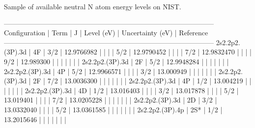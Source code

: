 \begin{table}
		\caption{Sample of available neutral N atom energy levels on NIST.\cite{NIST_ASD}}
		\begin{verbbox}
--------------------------------------------------------------------------------------------
Configuration      | Term   |    J |            Level (eV) |   Uncertainty (eV) | Reference
--------------------------------------------------------------------------------------------
2s2.2p2.(3P).3d    | 4F     |  3/2 |          12.9766982   |                    |          
                   |        |  5/2 |          12.9790452   |                    |          
                   |        |  7/2 |          12.9832470   |                    |          
                   |        |  9/2 |          12.989300    |                    |          
                   |        |      |                       |                    |           
2s2.2p2.(3P).3d    | 2F     |  5/2 |          12.9948284   |                    |          
                   |        |      |                       |                    |           
2s2.2p2.(3P).3d    | 4P     |  5/2 |          12.9966571   |                    |          
                   |        |  3/2 |          13.000949    |                    |          
                   |        |      |                       |                    |           
2s2.2p2.(3P).3d    | 2F     |  7/2 |          13.0036300   |                    |          
                   |        |      |                       |                    |           
2s2.2p2.(3P).3d    | 4P     |  1/2 |          13.004219    |                    |          
                   |        |      |                       |                    |           
2s2.2p2.(3P).3d    | 4D     |  1/2 |          13.016403    |                    |          
                   |        |  3/2 |          13.017878    |                    |          
                   |        |  5/2 |          13.019401    |                    |          
                   |        |  7/2 |          13.0205228   |                    |          
                   |        |      |                       |                    |           
2s2.2p2.(3P).3d    | 2D     |  3/2 |          13.0332040   |                    |          
                   |        |  5/2 |          13.0361585   |                    |          
                   |        |      |                       |                    |           
2s2.2p2.(3P).4p    | 2S*    |  1/2 |          13.2015646   |                    |          
                   |        |      |                       |                    |           

\end{verbbox}
\end{table}
